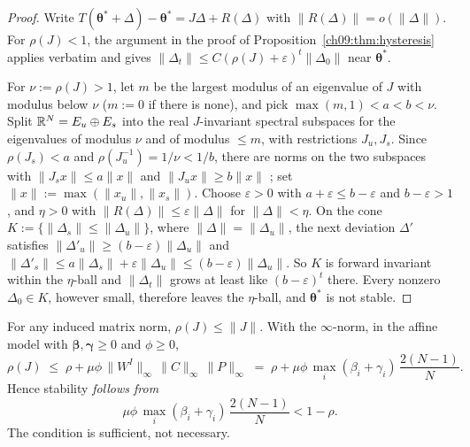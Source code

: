 \documentclass[../structural_economics_book.tex]{subfiles}
\begin{document}
\begin{proof}
Write $T(\boldsymbol{\theta}^* + \Delta) - \boldsymbol{\theta}^* = J\Delta + R(\Delta)$ with $\|R(\Delta)\| = o(\|\Delta\|)$. For $\rho(J) < 1$, the argument in the proof of Proposition~\ref{ch09:thm:hysteresis} applies verbatim and gives $\|\Delta_t\| \le C(\rho(J) + \varepsilon)^t\|\Delta_0\|$ near $\boldsymbol{\theta}^*$.

For $\nu := \rho(J) > 1$, let $m$ be the largest modulus of an eigenvalue of $J$ with modulus below $\nu$ ($m := 0$ if there is none), and pick $\max(m, 1) < a < b < \nu$. Split $\mathbb{R}^N = E_u \oplus E_s$ into the real $J$-invariant spectral subspaces for the eigenvalues of modulus $\nu$ and of modulus $\le m$, with restrictions $J_u, J_s$. Since $\rho(J_s) < a$ and $\rho(J_u^{-1}) = 1/\nu < 1/b$, there are norms on the two subspaces with $\|J_s x\| \le a\|x\|$ and $\|J_u x\| \ge b\|x\|$ \citep[Lemma~5.6.10]{horn2012matrix}; set $\|x\| := \max(\|x_u\|, \|x_s\|)$. Choose $\varepsilon > 0$ with $a + \varepsilon \le b - \varepsilon$ and $b - \varepsilon > 1$, and $\eta > 0$ with $\|R(\Delta)\| \le \varepsilon\|\Delta\|$ for $\|\Delta\| < \eta$. On the cone $K := \{\|\Delta_s\| \le \|\Delta_u\|\}$, where $\|\Delta\| = \|\Delta_u\|$, the next deviation $\Delta'$ satisfies $\|\Delta'_u\| \ge (b - \varepsilon)\|\Delta_u\|$ and $\|\Delta'_s\| \le a\|\Delta_s\| + \varepsilon\|\Delta_u\| \le (b - \varepsilon)\|\Delta_u\|$. So $K$ is forward invariant within the $\eta$-ball and $\|\Delta_t\|$ grows at least like $(b - \varepsilon)^t$ there. Every nonzero $\Delta_0 \in K$, however small, therefore leaves the $\eta$-ball, and $\boldsymbol{\theta}^*$ is not stable.
\end{proof}

\begin{proposition}\label{ch10:prop:stability_cond}
For any induced matrix norm, $\rho(J) \leq \|J\|$. With the $\infty$-norm, in the affine model with $\boldsymbol{\beta}, \boldsymbol{\gamma} \ge 0$ and $\phi \ge 0$,
\begin{equation}\label{ch10:eq:spectral_bound}
\rho(J) \;\leq\; \rho + \mu\phi\,\|W^I\|_\infty\,\|C\|_\infty\,\|P\|_\infty \;=\; \rho + \mu\phi\,\max_i(\beta_i + \gamma_i)\,\frac{2(N-1)}{N}.
\end{equation}
Hence stability \textit{follows from}
\begin{equation}\label{ch10:eq:stability_condition}
\mu\phi\,\max_i(\beta_i + \gamma_i)\,\frac{2(N-1)}{N} < 1 - \rho.
\end{equation}
The condition is sufficient, not necessary.
\end{proposition}
\end{document}
